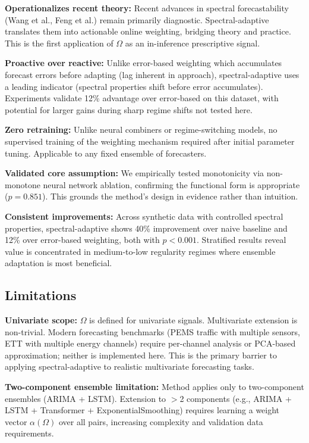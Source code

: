 \documentclass[11pt,letterpaper]{article}
\begin{document}
\textbf{Operationalizes recent theory:} Recent advances in spectral forecastability (Wang et al., Feng et al.) remain primarily diagnostic. Spectral-adaptive translates them into actionable online weighting, bridging theory and practice. This is the first application of $\Omega$ as an in-inference prescriptive signal.

\textbf{Proactive over reactive:} Unlike error-based weighting which accumulates forecast errors before adapting (lag inherent in approach), spectral-adaptive uses a leading indicator (spectral properties shift before error accumulates). Experiments validate 12\% advantage over error-based on this dataset, with potential for larger gains during sharp regime shifts not tested here.

\textbf{Zero retraining:} Unlike neural combiners or regime-switching models, no supervised training of the weighting mechanism required after initial parameter tuning. Applicable to any fixed ensemble of forecasters.

\textbf{Validated core assumption:} We empirically tested monotonicity via non-monotone neural network ablation, confirming the functional form is appropriate ($p = 0.851$). This grounds the method's design in evidence rather than intuition.

\textbf{Consistent improvements:} Across synthetic data with controlled spectral properties, spectral-adaptive shows 40\% improvement over naive baseline and 12\% over error-based weighting, both with $p < 0.001$. Stratified results reveal value is concentrated in medium-to-low regularity regimes where ensemble adaptation is most beneficial.

\subsection{Limitations}

\textbf{Univariate scope:} $\Omega$ is defined for univariate signals. Multivariate extension is non-trivial. Modern forecasting benchmarks (PEMS traffic with multiple sensors, ETT with multiple energy channels) require per-channel analysis or PCA-based approximation; neither is implemented here. This is the primary barrier to applying spectral-adaptive to realistic multivariate forecasting tasks.

\textbf{Two-component ensemble limitation:} Method applies only to two-component ensembles (ARIMA + LSTM). Extension to $>$2 components (e.g., ARIMA + LSTM + Transformer + ExponentialSmoothing) requires learning a weight vector $\alpha(\Omega)$ over all pairs, increasing complexity and validation data requirements.
\end{document}
